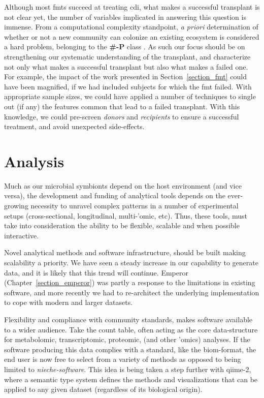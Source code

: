 Although most \glspl{fmt} succeed at treating \gls{cdi}, what makes a
successful transplant is not clear yet, the number of variables implicated in
answering this question is immense. From a computational complexity standpoint,
\textit{a priori} determination of whether or not a new community can colonize 
an existing ecosystem is considered a hard problem, belonging to the 
\textbf{\#-P} class \cite{RN4266}. As such our focus should be on strengthening 
our systematic understanding of the transplant, and characterize not only what 
makes a successful transplant but also what makes a failed one.  For example, 
the impact of the work presented in Section~\ref{section_fmt} could have been 
magnified, if we had included subjects for which the \gls{fmt} failed. With 
appropriate sample sizes, we could have applied a number of techniques to 
single out (if any) the features common that lead to a failed transplant. With 
this knowledge, we could pre-screen \textit{donors} and \textit{recipients} to 
ensure a successful treatment, and avoid unexpected side-effects.

\section{Analysis}

Much as our microbial symbionts depend on the host environment (and vice
versa), the development and funding of analytical tools depends on the
ever-growing necessity to unravel complex patterns in a number of experimental
setups (cross-sectional, longitudinal, multi-'omic, etc). Thus, these tools,
must take into consideration the ability to be flexible, scalable and when
possible interactive.

Novel analytical methods and software infrastructure, should be built making 
scalability a priority.  We have seen a steady increase in our capability to 
generate data, and it is likely that this trend will continue. Emperor 
(Chapter~\ref{section_emperor}) was partly a response to the limitations in 
existing software, and more recently we had to re-architect the underlying 
implementation to cope with modern and larger datasets.

Flexibility and compliance with community standards, makes software available
to a wider audience. Take the count table, often acting as the core
data-structure for metabolomic, transcriptomic, proteomic, (and other 'omics)
analyses. If the software producing this data complies with a standard, like
the \gls{biom}-format, the end user is now free to select from a variety of
methods as opposed to being limited to \textit{nieche-software}. This idea is 
being taken a step further with \gls{qiime}-2, where a semantic type system 
defines the methods and visualizations that can be applied to any given dataset 
(regardless of its biological origin).

